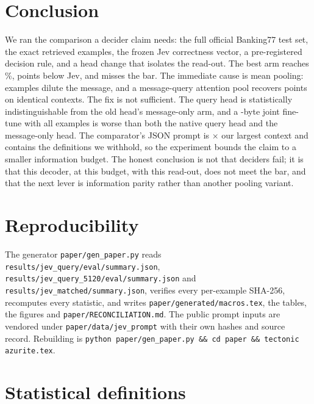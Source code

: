 \documentclass[11pt]{article}
\begin{document}
\section{Conclusion}

We ran the comparison a decider claim needs: the full official Banking77 test
set, the exact retrieved examples, the frozen Jev correctness vector, a
pre-registered decision rule, and a head change that isolates the read-out. The
best arm reaches \PQueryTwoAcc\%, \PQueryGapAbs{} points below Jev, and misses
the bar. The immediate cause is mean pooling: examples dilute the message, and
a message-query attention pool recovers \PMechGain{} points on identical
contexts. The fix is not sufficient. The query head is statistically
indistinguishable from the old head's message-only arm, and a \PSeq-byte joint
fine-tune with all \PExamples{} examples is worse than both the native query
head and the message-only head. The comparator's JSON prompt is
\PJevPromptRatio$\times$ our largest context and contains the definitions we
withhold, so the experiment bounds the claim to a smaller information budget.
The honest conclusion is not that deciders fail; it is that this decoder, at
this budget, with this read-out, does not meet the bar, and that the next lever
is information parity rather than another pooling variant.

\section*{Reproducibility}

The generator \texttt{paper/gen\_paper.py} reads
\texttt{results/jev\_query/eval/summary.json},
\texttt{results/jev\_query\_5120/eval/summary.json} and
\texttt{results/jev\_matched/summary.json}, verifies every per-example SHA-256,
recomputes every statistic, and writes \texttt{paper/generated/macros.tex},
the tables, the figures and \texttt{paper/RECONCILIATION.md}. The public prompt
inputs are vendored under \texttt{paper/data/jev\_prompt} with their own hashes
and source record. Rebuilding is
\texttt{python paper/gen\_paper.py \&\& cd paper \&\& tectonic azurite.tex}.



\appendix

\section{Statistical definitions}
\end{document}
